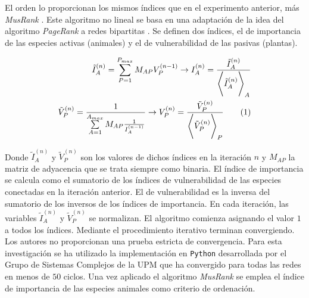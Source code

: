 El orden lo proporcionan los mismos índices que en el experimento anterior, más \textit{MusRank} \cite{dominguez2015ranking}. Este algoritmo no lineal se basa en una adaptación de la idea del algoritmo \textit{PageRank} a redes bipartitas \cite{tacchella2012new}. Se definen dos índices, el de importancia de las especies activas (animales) y el de vulnerabilidad de las pasivas (plantas).

\begin{align}
\tilde{I}^{(n)}_{A} =  \sum\limits_{P=1}^{{P}_{max}} {M}_{AP} {V}^{(n-1)}_{P} \rightarrow  {I}^{(n)}_{A} = \frac{\tilde{I}^{(n)}_{A}}{ {\Bigg \langle \tilde{I}^{(n)}_{A} \Bigg \rangle}_{A} }
\nonumber\\ 
\tilde{V}^{(n)}_{P} =  \frac{1}{\sum\limits_{A=1}^{{A}_{max}} {M}_{AP} \frac{1}{{I}^{(n-1)}_{A}} } \rightarrow  {V}^{(n)}_{P} = \frac{\tilde{V}^{(n)}_{P}}{ {\Bigg \langle \tilde{V}^{(n)}_{P} \Bigg \rangle}_{P} }
\stepcounter{equation}\tag{\theequation}\label{eq:DEST_MusRank}
\end{align}

Donde $\tilde{I}^{(n)}_{A}$ y $\tilde{V}^{(n)}_{P}$ son los valores de dichos índices en la iteración $n$ y ${M}_{AP}$ la matriz de adyacencia que se trata siempre como binaria. El índice de importancia se calcula como el sumatorio de los índices de vulnerabilidad de las especies conectadas en la iteración anterior. El de vulnerabilidad es la inversa del sumatorio de los inversos de los índices de importancia. En cada iteración, las variables $\tilde{I}^{(n)}_{A}$ y $\tilde{V}^{(n)}_{P}$ se normalizan. El algoritmo comienza asignando el valor $1$ a todos los índices. Mediante el procedimiento iterativo terminan convergiendo. Los autores no proporcionan una prueba estricta de convergencia. Para esta investigación se ha utilizado la implementación en \texttt{Python} desarrollada por el Grupo de Sistemas Complejos de la UPM que ha convergido para todas las redes en menos de $50$ ciclos. Una vez aplicado el algoritmo \textit{MusRank} se emplea el índice de importancia de las especies animales como criterio de ordenación.


